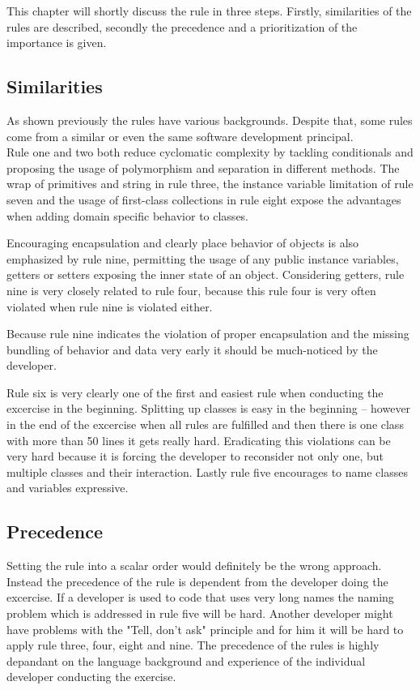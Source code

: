 This chapter will shortly discuss the rule in three steps. Firstly, similarities of the rules are described, secondly the precedence and a prioritization of the importance is given.

\subsection*{Similarities}
As shown previously the rules have various backgrounds. Despite that, some rules come from a similar or even the same software development principal.
\\

Rule one and two both reduce cyclomatic complexity by tackling conditionals and proposing the usage of polymorphism and separation in different methods.
The wrap of primitives and string in rule three, the instance variable limitation of rule seven and the usage of first-class collections in rule eight expose the advantages when adding domain specific behavior to classes. 

Encouraging encapsulation and clearly place behavior of objects is also emphasized by rule nine, permitting the usage of any public instance variables, getters or setters exposing the inner state of an object. Considering getters, rule nine is very closely related to rule four, because this rule four is very often violated when rule nine is violated either. 

Because rule nine indicates the violation of proper encapsulation and the missing bundling of behavior and data very early it should be much-noticed by the developer. 

Rule six is very clearly one of the first and easiest rule when conducting the excercise in the beginning. Splitting up classes is easy in the beginning -- however in the end of the excercise when all rules are fulfilled and then there is one class with more than 50 lines it gets really hard. Eradicating this violations can be very hard because it is forcing the developer to reconsider not only one, but multiple classes and their interaction. 
Lastly rule five encourages to name classes and variables expressive. 

\subsection*{Precedence}
Setting the rule into a scalar order would definitely be the wrong approach. Instead the precedence of the rule is dependent from the developer doing the excercise. If a developer is used to code that uses very long names the naming problem which is addressed in rule five will be hard. Another developer might have problems with the "Tell, don't ask" principle and for him it will be hard to apply rule three, four, eight and nine. The precedence of the rules is highly depandant on the language background and experience of the individual developer conducting the exercise. 

